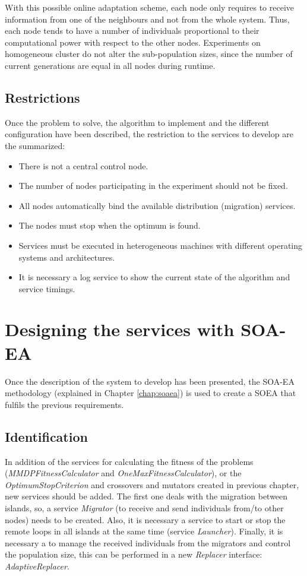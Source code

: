 With this possible online adaptation scheme, each node only requires
to receive information from one of the neighbours and not from the
whole system. %
Thus, each node tends to have a number of individuals proportional to
their computational power with respect to the other nodes. Experiments
on homogeneous cluster do not alter the sub-population sizes, since
the number of current generations are equal in all nodes during
runtime. %

\subsection{Restrictions}
Once the problem to solve, the algorithm to implement and the different configuration have been described, the restriction to the services to develop are the summarized:
\begin{itemize}
\item There is not a central control node.
\item The number of nodes participating in the experiment should not be fixed.
\item All nodes automatically bind the available distribution (migration) services.
\item The nodes must stop when the optimum is found.
\item Services must be executed in heterogeneous machines with different operating systems and architectures.
\item It is necessary a log service to show the current state of the algorithm and service timings.
\end{itemize}


\section{Designing the services with SOA-EA}
Once the description of the system to develop has been presented, the SOA-EA methodology (explained in Chapter \ref{chap:soaea}) is used to create a SOEA that fulfils the previous requirements.

\subsection{Identification}

In addition of the services for calculating the fitness of the problems ({\em MMDPFitnessCalculator} and {\em OneMaxFitnessCalculator}), or the {\em OptimumStopCriterion} and crossovers and mutators created in previous chapter, new services should be added. The first one deals with the migration between islands, so, a service {\em Migrator} (to receive and send individuals from/to other nodes) needs to be created. Also, it is necessary a service to start or stop the remote loops in all islands at the same time (service {\em Launcher}). Finally, it is necessary a to manage the received individuals from the migrators and control the population size, this can be performed in a new {\em Replacer} interface: {\em AdaptiveReplacer}.

